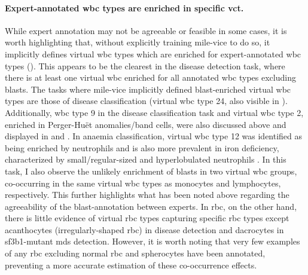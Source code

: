 \begin{figure}[!ht]
    \label{fig:annotated-wbc-rate-test}
\end{figure}

\paragraph{Expert-annotated \ac{wbc} types are enriched in specific \ac{vct}.} While expert annotation may not be agreeable or feasible in some cases, it is worth highlighting that, without explicitly training \ac{mile-vice} to do so, it implicitly defines virtual \ac{wbc} types which are enriched for expert-annotated \ac{wbc} types (). This appears to be the clearest in the disease detection task, where there is at least one virtual \ac{wbc} enriched for all annotated \ac{wbc} types excluding blasts. The tasks where \ac{mile-vice} implicitly defined blast-enriched virtual \ac{wbc} types are those of disease classification (virtual \ac{wbc} type 24, also visible in ). Additionally, \ac{wbc} type 9 in the disease classification task and virtual \ac{wbc} type 2, enriched in Perger-Huët anomalies/band cells, were also discussed above and displayed in  and . In anaemia classification, virtual \ac{wbc} type 12 was identified as being enriched by neutrophils and is also more prevalent in iron deficiency, characterized by small/regular-sized and hyperlobulated neutrophils . In this task, I also observe the unlikely enrichment of blasts in two virtual \ac{wbc} groups, co-occurring in the same virtual \ac{wbc} types as monocytes and lymphocytes, respectively. This further highlights what has been noted above regarding the agreeability of the blast-annotation between experts. In \ac{rbc}, on the other hand, there is little evidence of virtual \ac{rbc} types capturing specific \ac{rbc} types except acanthocytes (irregularly-shaped \ac{rbc}) in disease detection and dacrocytes in \ac{sf3b1}-mutant \ac{mds} detection. However, it is worth noting that very few examples of any \ac{rbc} excluding normal \ac{rbc} and spherocytes have been annotated, preventing a more accurate estimation of these co-occurrence effects.

